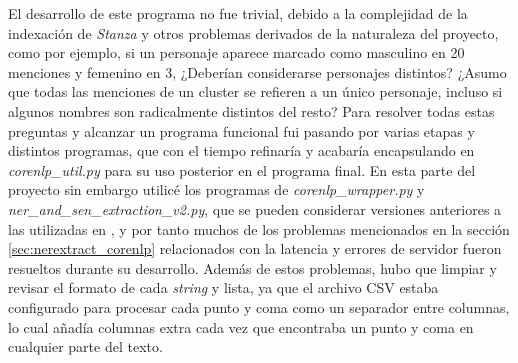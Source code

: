 \documentclass{pre-tfg}
\begin{document}
El desarrollo de este programa no fue trivial, debido a la complejidad de la indexación de \textit{Stanza} y otros problemas derivados de la naturaleza del proyecto, como por ejemplo, si un personaje aparece marcado como masculino en 20 menciones y femenino en 3, ¿Deberían considerarse personajes distintos? ¿Asumo que todas las menciones de un cluster se refieren a un único personaje, incluso si algunos nombres son radicalmente distintos del resto?
Para resolver todas estas preguntas y alcanzar un programa funcional fui pasando por varias etapas y distintos programas, que con el tiempo refinaría y acabaría encapsulando en \textit{corenlp\_util.py} para su uso posterior en el programa final. En esta parte del proyecto sin embargo utilicé los programas de \textit{corenlp\_wrapper.py} y \textit{ner\_and\_sen\_extraction\_v2.py}, que se pueden considerar versiones anteriores a las utilizadas en , y por tanto muchos de los problemas mencionados en la sección \ref{sec:nerextract_corenlp} relacionados con la latencia y errores de servidor fueron resueltos durante su desarrollo. Además de estos problemas, hubo que limpiar y revisar el formato de cada \textit{string} y lista, ya que el archivo CSV estaba configurado para procesar cada punto y coma como un separador entre columnas, lo cual añadía columnas extra cada vez que encontraba un punto y coma en cualquier parte del texto.
 
\begin{table}[]
	\caption{Estructura de \textit{fic\_sentences.csv}}
	\label{table:fic_sentences}
\end{table}
 
\end{document}
